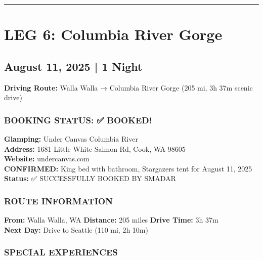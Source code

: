 \documentclass[
  11pt,
]{article}
\begin{document}
\begin{center}\rule{0.5\linewidth}{0.5pt}\end{center}

\newpage

\section{\texorpdfstring{\textcolor{primary}{LEG 6: Columbia River Gorge}}{}}\label{section-39}

\subsection{\texorpdfstring{\textcolor{secondary}{August 11, 2025 | 1 Night}}{}}\label{section-40}

\textbf{\textcolor{secondary}{Driving Route:}} Walla Walla → Columbia
River Gorge (205 mi, 3h 37m scenic drive)

\subsubsection{\texorpdfstring{\textcolor{primary}{BOOKING STATUS: ✅ BOOKED!}}{}}\label{section-41}

\textbf{\textcolor{secondary}{Glamping:}} Under Canvas Columbia River\\
\textbf{\textcolor{secondary}{Address:}} 1681 Little White Salmon Rd,
Cook, WA 98605\\
\textbf{\textcolor{secondary}{Website:}} undercanvas.com\\
\textbf{\textcolor{primary}{CONFIRMED:}} King bed with bathroom,
Stargazers tent for August 11, 2025\\
\textbf{\textcolor{primary}{Status:}} ✅ SUCCESSFULLY BOOKED BY SMADAR

\subsubsection{\texorpdfstring{\textcolor{primary}{ROUTE INFORMATION}}{}}\label{section-42}

\textbf{\textcolor{secondary}{From:}} Walla Walla, WA \textbar{}
\textbf{\textcolor{secondary}{Distance:}} 205 miles \textbar{}
\textbf{\textcolor{secondary}{Drive Time:}} 3h 37m\\
\textbf{\textcolor{secondary}{Next Day:}} Drive to Seattle (110 mi, 2h
10m)

\subsubsection{\texorpdfstring{\textcolor{primary}{SPECIAL EXPERIENCES}}{}}\label{section-43}
\end{document}
